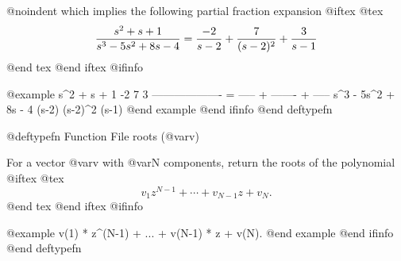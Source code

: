 @noindent
which implies the following partial fraction expansion
@iftex
@tex
$$
{s^2+s+1\over s^3-5s^2+8s-4} = {-2\over s-2} + {7\over (s-2)^2} + {3\over s-1}
$$
@end tex
@end iftex
@ifinfo

@example
        s^2 + s + 1       -2        7        3
   ------------------- = ----- + ------- + -----
   s^3 - 5s^2 + 8s - 4   (s-2)   (s-2)^2   (s-1)
@end example
@end ifinfo
@end deftypefn

@deftypefn {Function File} {} roots (@var{v})

For a vector @var{v} with @var{N} components, return
the roots of the polynomial
@iftex
@tex
$$
v_1 z^{N-1} + \cdots + v_{N-1} z + v_N.
$$
@end tex
@end iftex
@ifinfo

@example
v(1) * z^(N-1) + ... + v(N-1) * z + v(N).
@end example
@end ifinfo
@end deftypefn
